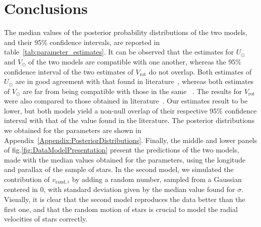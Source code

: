 \section{Conclusions}

The median values of the posterior probability distributions of the two models, and their 95\% confidence intervals, are reported in table~\ref{tab:parameter_estimates}. It can be observed that the estimates for $U_\odot$ and $V_\odot$ of the two models are compatible with one another, whereas the 95\% confidence interval of the two estimates of $V_{\text{rot}}$ do not overlap. Both estimates of $U_\odot$ are in good agreement with that found in literature~\cite{LocalKinematics}, whereas both estimates of $V_\odot$ are far from being compatible with those in the same ~\cite{LocalKinematics}. The results for $V_{\text{rot}}$ were also compared to those obtained in literature~\cite{GalacticKinematics}. Our estimates result to be lower, but both models yield a non-null overlap of their respective 95\% confidence interval with that of the value found in the literature. The posterior distributions we obtained for the parameters are shown in Appendix~\ref{Appendix:PosteriorDistributions}.
Finally, the middle and lower panels of fig.\ref{fig:DataModelPresentation} present the predictions of the two models, made with the median values obtained for the parameters, using the longitude and parallax of the sample of stars. In the second model, we simulated the contribution of $v_{\text{rand}, i}$ by adding a random number, sampled from a Gaussian centered in 0, with standard deviation given by the median value found for $\sigma$. Visually, it is clear that the second model reproduces the data better than the first one, and that the random motion of stars is crucial to model the radial velocities of stars correctly. 

